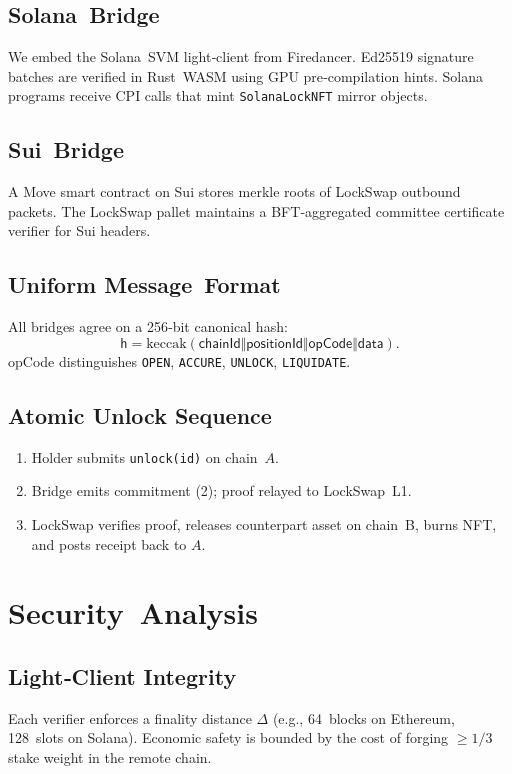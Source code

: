 \documentclass[11pt]{article}
\begin{document}
\subsection{Solana Bridge}
We embed the Solana SVM light‑client from Firedancer.  Ed25519 signature batches are verified in Rust WASM using GPU pre‑compilation hints. Solana programs receive CPI calls that mint \texttt{SolanaLockNFT} mirror objects.

\subsection{Sui Bridge}
A Move smart contract on Sui stores merkle roots of LockSwap outbound packets.  The LockSwap pallet maintains a BFT‑aggregated committee certificate verifier for Sui headers.

\subsection{Uniform Message Format}
All bridges agree on a 256‑bit canonical hash:
\begin{equation}
\mathsf{h}=\text{keccak}(\textsf{chainId}\Vert\textsf{positionId}\Vert\textsf{opCode}\Vert\textsf{data}).\tag{2}
\end{equation}
\textsf{opCode} distinguishes \texttt{OPEN}, \texttt{ACCURE}, \texttt{UNLOCK}, \texttt{LIQUIDATE}.

\subsection{Atomic Unlock Sequence}
\begin{enumerate}
\item Holder submits \texttt{unlock(id)} on chain $A$.
\item Bridge emits commitment (2); proof relayed to LockSwap L1.
\item LockSwap verifies proof, releases counterpart asset on chain B, burns NFT, and posts receipt back to $A$.
\end{enumerate}

\section{Security Analysis}
\subsection{Light‑Client Integrity}
Each verifier enforces a finality distance $\Delta$ (e.g., 64 blocks on Ethereum, 128 slots on Solana). Economic safety is bounded by the cost of forging $\ge 1/3$ stake weight in the remote chain.
\end{document}
